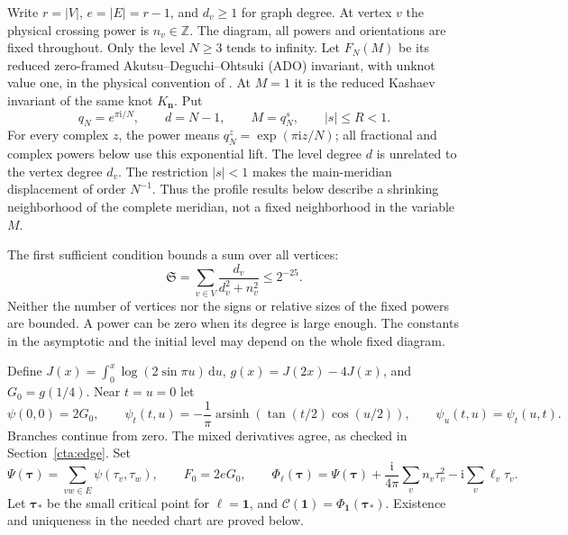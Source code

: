 \documentclass[11pt]{article}
\numberwithin{equation}{section}
\theoremstyle{definition}\newtheorem{definition}[theorem]{Definition}
\theoremstyle{remark}\newtheorem{remark}[theorem]{Remark}
\newcommand{\ii}{\mathrm i}
\newcommand{\dd}{\mathrm d}
\newcommand{\calC}{\mathcal C}
\begin{document}
Write \(r=|V|\), \(e=|E|=r-1\), and \(d_v\ge1\) for graph degree.
At vertex \(v\) the physical crossing power is \(n_v\in\mathbb Z\).
The diagram, all powers and orientations are fixed throughout.
Only the level \(N\ge3\) tends to infinity. Let \(F_N(M)\) be its
reduced zero-framed Akutsu--Deguchi--Ohtsuki (ADO) invariant, with unknot value one, in the
physical convention of \cite{Meridian}. At \(M=1\) it is the reduced
Kashaev invariant of the same knot \(K_{\mathbf n}\). Put
\[
 q_N=e^{\pi\ii/N},\qquad d=N-1,\qquad M=q_N^s,\qquad |s|\le R<1.
\]
For every complex \(z\), the power means
\(q_N^z=\exp(\pi\ii z/N)\); all fractional and complex powers
below use this exponential lift.
The level degree \(d\) is unrelated to the vertex degree \(d_v\).
The restriction $|s|<1$ makes the main-meridian displacement of
order $N^{-1}$. Thus the profile results below describe a shrinking
neighborhood of the complete meridian, not a fixed neighborhood in
the variable $M$.

The first sufficient condition bounds a sum over all vertices:
\begin{equation}\label{cta:sum}
 \mathfrak S=\sum_{v\in V}\frac{d_v}{d_v^2+n_v^2}\le2^{-25}.
\end{equation}
Neither the number of vertices nor the signs or relative sizes of
the fixed powers are bounded. A power can be zero when its degree is
large enough. The constants in the asymptotic and the initial level
may depend on the whole fixed diagram.

Define \(J(x)=\int_0^x\log(2\sin\pi u)\,\dd u\),
\(g(x)=J(2x)-4J(x)\), and \(G_0=g(1/4)\). Near \(t=u=0\) let
\begin{equation}\label{cta:psi-definition}
 \psi(0,0)=2G_0,\qquad
 \psi_t(t,u)=-\frac1\pi
     \operatorname{arsinh}\!\left(\tan(t/2)\cos(u/2)\right),
 \qquad\psi_u(t,u)=\psi_t(u,t).
\end{equation}
Branches continue from zero. The mixed derivatives agree, as checked
in Section~\ref{cta:edge}. Set
\[
 \Psi(\boldsymbol\tau)=\sum_{vw\in E}\psi(\tau_v,\tau_w),
 \qquad F_0=2eG_0,\qquad
 \Phi_{\boldsymbol\ell}(\boldsymbol\tau)
 =\Psi(\boldsymbol\tau)+\frac{\ii}{4\pi}
       \sum_v n_v\tau_v^2-\ii\sum_v\ell_v\tau_v .
\]
Let \(\boldsymbol\tau_*\) be the small critical point for
\(\boldsymbol\ell=\mathbf1\), and
\(\calC(\mathbf1)=\Phi_{\mathbf1}(\boldsymbol\tau_*)\).
Existence and uniqueness in the needed chart are proved below.
\end{document}
